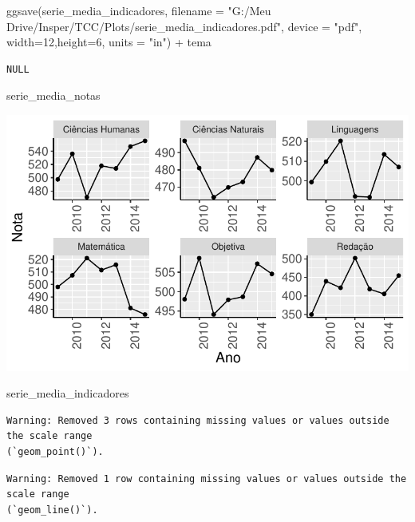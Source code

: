 \documentclass[
  letterpaper,
  DIV=11,
  numbers=noendperiod]{scrartcl}
\newenvironment{Shaded}{\begin{snugshade}}{\end{snugshade}}
\newcommand{\AttributeTok}[1]{\textcolor[rgb]{0.40,0.45,0.13}{#1}}
\newcommand{\DecValTok}[1]{\textcolor[rgb]{0.68,0.00,0.00}{#1}}
\newcommand{\FunctionTok}[1]{\textcolor[rgb]{0.28,0.35,0.67}{#1}}
\newcommand{\NormalTok}[1]{\textcolor[rgb]{0.00,0.23,0.31}{#1}}
\newcommand{\SpecialCharTok}[1]{\textcolor[rgb]{0.37,0.37,0.37}{#1}}
\newcommand{\StringTok}[1]{\textcolor[rgb]{0.13,0.47,0.30}{#1}}
\begin{document}
\begin{Shaded}
\begin{Highlighting}[]
\FunctionTok{ggsave}\NormalTok{(serie\_media\_indicadores, }
       \AttributeTok{filename =} \StringTok{"G:/Meu Drive/Insper/TCC/Plots/serie\_media\_indicadores.pdf"}\NormalTok{,}
       \AttributeTok{device =} \StringTok{"pdf"}\NormalTok{,}
       \AttributeTok{width=}\DecValTok{12}\NormalTok{,}\AttributeTok{height=}\DecValTok{6}\NormalTok{, }\AttributeTok{units =} \StringTok{"in"}\NormalTok{) }\SpecialCharTok{+}
\NormalTok{  tema}
\end{Highlighting}
\end{Shaded}

\begin{verbatim}
NULL
\end{verbatim}

\begin{Shaded}
\begin{Highlighting}[]
\NormalTok{serie\_media\_notas}
\end{Highlighting}
\end{Shaded}

\includegraphics{script_files/figure-latex/unnamed-chunk-8-1.pdf}

\begin{Shaded}
\begin{Highlighting}[]
\NormalTok{serie\_media\_indicadores}
\end{Highlighting}
\end{Shaded}

\begin{verbatim}
Warning: Removed 3 rows containing missing values or values outside the scale range
(`geom_point()`).
\end{verbatim}

\begin{verbatim}
Warning: Removed 1 row containing missing values or values outside the scale range
(`geom_line()`).
\end{verbatim}
\end{document}
